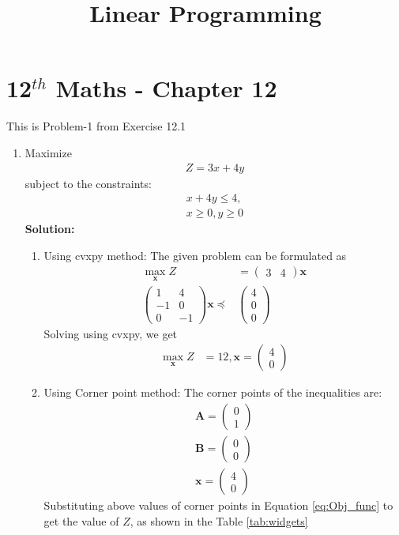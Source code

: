 \documentclass[12pt]{article}
\newcommand{\solution}{\noindent \textbf{Solution: }}
\newcommand{\myvec}[1]{\ensuremath{\begin{pmatrix}#1\end{pmatrix}}}
\let\vec\mathbf
\begin{document}
\begin{center}
\title{\textbf{Linear Programming}}
\date{\vspace{-5ex}} %
\maketitle
\end{center}
\setcounter{page}{1}

\section{12$^{th}$ Maths - Chapter 12}
This is Problem-1 from Exercise 12.1
\begin{enumerate}
\item Maximize
\begin{align}
	\label{eq:Obj_func}
	Z = 3x + 4y
\end{align}
subject to the constraints:
\begin{align}
	x+4y \leq 4, \\ 
	x \geq 0, y \geq 0
\end{align}
\solution 
\begin{enumerate}
\item Using cvxpy method: The given problem can be formulated as 
\begin{align}
	\max_{\vec{x}} Z &= \myvec{3 & 4}\vec{x} \\
        \myvec{1 & 4\\
               -1 &0\\
	       0 & -1}\vec{x}\preceq & \myvec{4 \\0\\0}
\end{align}
Solving using cvxpy, we get
\begin{align}
	\label{eq:maxval}
	\max_{\vec{x}} Z &= 12 , 
	\vec{x} = \myvec{4  \\  0} 
\end{align}
\item Using Corner point method: The corner points of  the inequalities are:
\begin{align}
	\vec{A} = \myvec{0 \\ 1}\\
	\vec{B} = \myvec{0 \\ 0} \\
	\vec{x} = \myvec{4 \\ 0} 
\end{align}
Substituting above values of corner points in Equation \eqref{eq:Obj_func} to get the value of $Z$, as shown in the Table \ref{tab:widgets}
\begin{table}[!h]
	\centering
	 
	\caption{}
	\label{tab:widgets}
\end{table}


\end{enumerate}
\end{enumerate}
\end{document}
